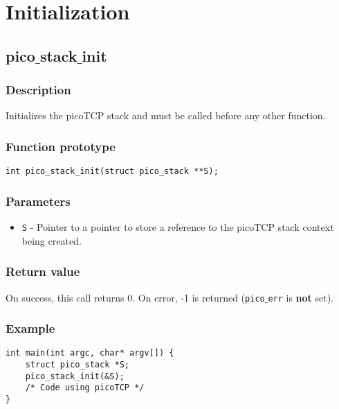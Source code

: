 \section{Initialization}

\subsection{pico$\_$stack$\_$init}

\subsubsection*{Description}
Initializes the picoTCP stack and must be called before any other function.

\subsubsection*{Function prototype}
\begin{verbatim}
int pico_stack_init(struct pico_stack **S);
\end{verbatim}

\subsubsection*{Parameters}
\begin{itemize}[noitemsep]
\item \texttt{S} - Pointer to a pointer to store a reference to the picoTCP stack context being created.
\end{itemize}

\subsubsection*{Return value}
On success, this call returns 0.
On error, -1 is returned (\texttt{pico$\_$err} is \textbf{not} set).

\subsubsection*{Example}
\begin{verbatim}
int main(int argc, char* argv[]) {
    struct pico_stack *S;
    pico_stack_init(&S);
    /* Code using picoTCP */
}
\end{verbatim}
